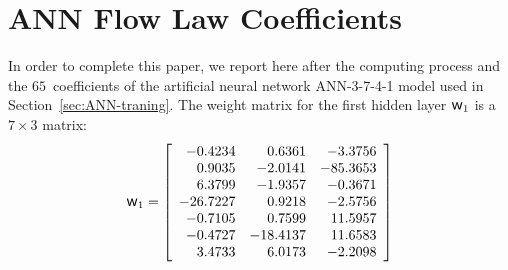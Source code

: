 \documentclass[algorithms,article,accept,pdftex,moreauthors]{Definitions/mdpi}
\DeclareRobustCommand{\w}{\mbox{\large\ensuremath{\mathsf{w}}}}
\begin{document}

\appendixstart
\appendix
\section[\appendixname~\thesection]{ANN Flow Law Coefficients\label{sec:Appendix}}

In order to complete this paper, we report here after the computing process and the $65$~coefficients of the artificial neural network ANN-3-7-4-1 model used in Section~\ref{sec:ANN-traning}.
The weight matrix for the first hidden layer $\w_1$ is a $7\times3$ matrix:
\begin{equation*}
\w_1 = \left[
\begin{array}{rrr}
	-0.4234  & 0.6361   & -3.3756  \\
	0.9035   & -2.0141  & -85.3653 \\
	6.3799   & -1.9357  & -0.3671  \\
	-26.7227 & 0.9218   & -2.5756  \\
	-0.7105  & 0.7599   & 11.5957  \\
	-0.4727  & -18.4137 & 11.6583  \\
	3.4733   & 6.0173   & -2.2098
\end{array}\right]
\end{equation*}
\end{document}
